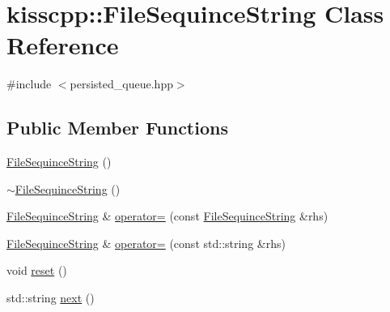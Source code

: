\hypertarget{classkisscpp_1_1_file_sequince_string}{\section{kisscpp\-:\-:File\-Sequince\-String Class Reference}
\label{classkisscpp_1_1_file_sequince_string}
}


{\ttfamily \#include $<$persisted\-\_\-queue.\-hpp$>$}

\subsection*{Public Member Functions}
\begin{DoxyCompactItemize}
\item 
\hyperlink{classkisscpp_1_1_file_sequince_string_ab378cb573d6b5fbef2669823e51b0bd6}{File\-Sequince\-String} ()
\item 
\hyperlink{classkisscpp_1_1_file_sequince_string_a65e065469610a9c0405faf7af34e10c8}{$\sim$\-File\-Sequince\-String} ()
\item 
\hyperlink{classkisscpp_1_1_file_sequince_string}{File\-Sequince\-String} \& \hyperlink{classkisscpp_1_1_file_sequince_string_a942e78a3d1ba76e8b8d5671c4ca9358d}{operator=} (const \hyperlink{classkisscpp_1_1_file_sequince_string}{File\-Sequince\-String} \&rhs)
\item 
\hyperlink{classkisscpp_1_1_file_sequince_string}{File\-Sequince\-String} \& \hyperlink{classkisscpp_1_1_file_sequince_string_a0a5f8c8c6fba6177297c98dbe92b5772}{operator=} (const std\-::string \&rhs)
\item 
void \hyperlink{classkisscpp_1_1_file_sequince_string_a501332a509814ab09021030b3e433a94}{reset} ()
\item 
std\-::string \hyperlink{classkisscpp_1_1_file_sequince_string_ac836ea7811841f47eaeeb0f749ae74dc}{next} ()
\end{DoxyCompactItemize}



